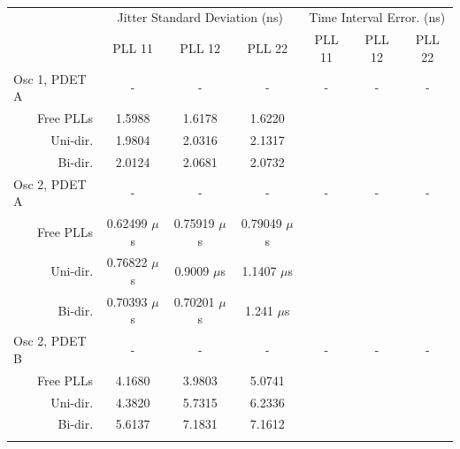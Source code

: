 \documentclass[conference]{IEEEtran}
\newcommand\T{\rule{0pt}{2.6ex}}       %
\newcommand\B{\rule[-1.2ex]{0pt}{0pt}} %
\begin{document}
{\begin{table}[!ht]
    \begin{center}
        \begin{tiny}
            \begin{tabular}{cc|c|c|c|c|c|c|}           
                \cline{3-8}
                && \multicolumn{3}{c|}{Jitter Standard Deviation (ns)} & \multicolumn{3}{c|}{Time Interval Error. (ns)} \T\\
                \cline{3-8} 
                &&PLL 11&PLL 12&PLL 22&PLL 11&PLL 12&PLL 22\T\\
                \hline
                \multicolumn{2}{|l|}{Osc 1, PDET A}&-&-&-&-&-&-\T\\
                \multicolumn{2}{|r|}{Free PLLs}&1.5988&1.6178&1.6220&&& \T\\
                \multicolumn{2}{|r|}{Uni-dir.}&1.9804&2.0316&2.1317&&& \T\\
                \multicolumn{2}{|r|}{Bi-dir.}&2.0124&2.0681&2.0732&&& \T\\
                \hline
                \multicolumn{2}{|l|}{Osc 2, PDET A}&-&-&-&-&-&-\T\\
                \multicolumn{2}{|r|}{Free PLLs}&0.62499 $\mu$s&0.75919 $\mu$s&0.79049  $\mu$s&&& \T\\
                \multicolumn{2}{|r|}{Uni-dir.}&0.76822 $\mu$s&0.9009 $\mu$s&1.1407 $\mu$s&&& \T\\
                \multicolumn{2}{|r|}{Bi-dir.}&0.70393 $\mu$s&0.70201 $\mu$s&1.241 $\mu$s&&& \T\\
                \hline
                \multicolumn{2}{|l|}{Osc 2, PDET B}&-&-&-&-&-&-\T\\
                \multicolumn{2}{|r|}{Free PLLs}&4.1680&3.9803&5.0741&&& \T\\
                \multicolumn{2}{|r|}{Uni-dir.}&4.3820&5.7315&6.2336 &&& \T\\
                \multicolumn{2}{|r|}{Bi-dir.}&5.6137&7.1831&7.1612 &&& \T\\
                \hline
                \B
            \end{tabular}
        \end{tiny}
        \caption{}
        \label{table:b_c_perf}
    \end{center}
\end{table}

}
\end{document}
